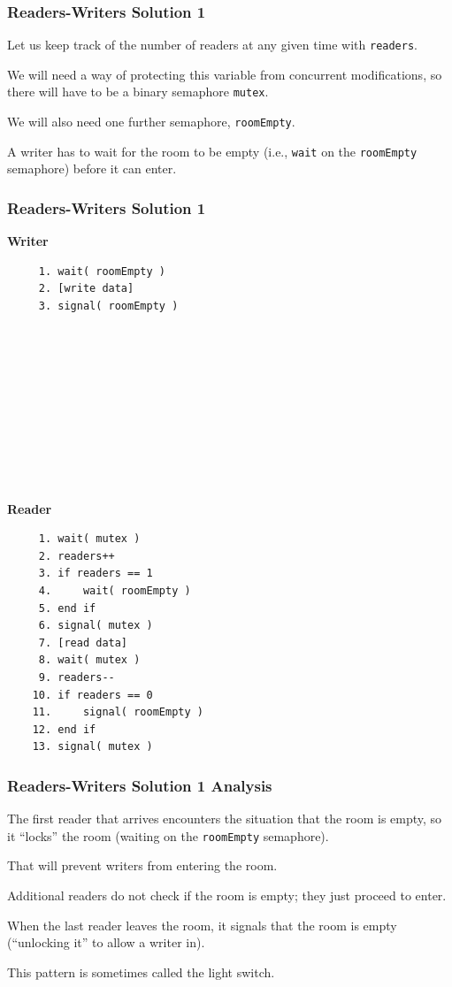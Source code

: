 \begin{frame}
\frametitle{Readers-Writers Solution 1}
Let us keep track of the number of readers at any given time with \texttt{readers}. 

We will need a way of protecting this variable from concurrent modifications, so there will have to be a binary semaphore \texttt{mutex}. 

We will also need one further semaphore, \texttt{roomEmpty}.

A writer has to wait for the room to be empty (i.e., \texttt{wait} on the \texttt{roomEmpty} semaphore) before it can enter.
\end{frame}



\begin{frame}[fragile]
\frametitle{Readers-Writers Solution 1}

\begin{multicols}{2}
\textbf{Writer}
  \begin{verbatim}
	 1. wait( roomEmpty )
	 2. [write data]
	 3. signal( roomEmpty )
	 
	 
	 
	 
	 
	 
	 
	 
	 
	 
  \end{verbatim}
\columnbreak
\textbf{Reader}
  \begin{verbatim}
	 1. wait( mutex )
	 2. readers++
	 3. if readers == 1
	 4.     wait( roomEmpty )
	 5. end if
	 6. signal( mutex )
	 7. [read data]
	 8. wait( mutex )
	 9. readers--
	10. if readers == 0
	11.     signal( roomEmpty )
	12. end if
	13. signal( mutex )
  \end{verbatim}
\end{multicols}
\vspace{-2em}

\end{frame}

\begin{frame}
\frametitle{Readers-Writers Solution 1 Analysis}

The first reader that arrives encounters the situation that the room is empty, so it ``locks'' the room (waiting on the \texttt{roomEmpty} semaphore).

That will prevent writers from entering the room. 

Additional readers do not check if the room is empty; they just proceed to enter. 

When the last reader leaves the room, it signals that the room is empty (``unlocking it'' to allow a writer in). 

This pattern is sometimes called the \alert{light switch}.

\end{frame}


